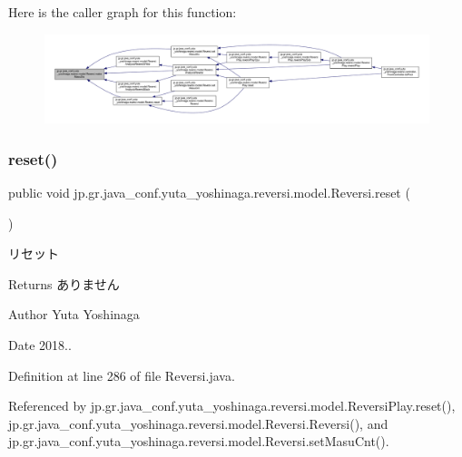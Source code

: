 Here is the caller graph for this function\+:\nopagebreak
\begin{figure}[H]
\begin{center}
\leavevmode
\includegraphics[width=350pt]{classjp_1_1gr_1_1java__conf_1_1yuta__yoshinaga_1_1reversi_1_1model_1_1_reversi_a9929ed36140ddc25923ede99f86564c3_icgraph}
\end{center}
\end{figure}
\mbox{\label{classjp_1_1gr_1_1java__conf_1_1yuta__yoshinaga_1_1reversi_1_1model_1_1_reversi_a497552844cbae36207f2d8c836a26b8e}} 
\subsubsection{\texorpdfstring{reset()}{reset()}}
{\footnotesize\ttfamily public void jp.\+gr.\+java\+\_\+conf.\+yuta\+\_\+yoshinaga.\+reversi.\+model.\+Reversi.\+reset (\begin{DoxyParamCaption}{ }\end{DoxyParamCaption})}



リセット 

\begin{DoxyReturn}{Returns}
ありません 
\end{DoxyReturn}
\begin{DoxyAuthor}{Author}
Yuta Yoshinaga 
\end{DoxyAuthor}
\begin{DoxyDate}{Date}
2018.. 
\end{DoxyDate}


Definition at line 286 of file Reversi.\+java.



Referenced by jp.\+gr.\+java\+\_\+conf.\+yuta\+\_\+yoshinaga.\+reversi.\+model.\+Reversi\+Play.\+reset(), jp.\+gr.\+java\+\_\+conf.\+yuta\+\_\+yoshinaga.\+reversi.\+model.\+Reversi.\+Reversi(), and jp.\+gr.\+java\+\_\+conf.\+yuta\+\_\+yoshinaga.\+reversi.\+model.\+Reversi.\+set\+Masu\+Cnt().

